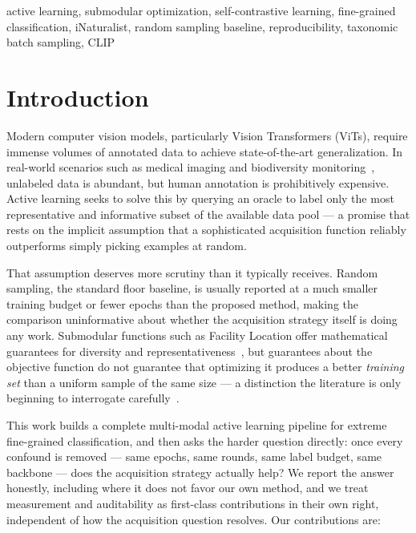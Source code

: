\documentclass[conference]{IEEEtran}
\begin{document}
\begin{IEEEkeywords}
active learning, submodular optimization, self-contrastive learning, fine-grained classification, iNaturalist, random sampling baseline, reproducibility, taxonomic batch sampling, CLIP
\end{IEEEkeywords}

\section{Introduction}

Modern computer vision models, particularly Vision Transformers (ViTs), require immense volumes of annotated data to achieve state-of-the-art generalization. In real-world scenarios such as medical imaging and biodiversity monitoring~\cite{vanhorn2018inaturalist}, unlabeled data is abundant, but human annotation is prohibitively expensive. Active learning seeks to solve this by querying an oracle to label only the most representative and informative subset of the available data pool — a promise that rests on the implicit assumption that a sophisticated acquisition function reliably outperforms simply picking examples at random.

That assumption deserves more scrutiny than it typically receives. Random sampling, the standard floor baseline, is usually reported at a much smaller training budget or fewer epochs than the proposed method, making the comparison uninformative about whether the acquisition strategy itself is doing any work. Submodular functions such as Facility Location offer mathematical guarantees for diversity and representativeness~\cite{nemhauser1978analysis}, but guarantees about the objective function do not guarantee that optimizing it produces a better \emph{training set} than a uniform sample of the same size — a distinction the literature is only beginning to interrogate carefully~\cite{mittal2019parting,munjal2022towards}.

This work builds a complete multi-modal active learning pipeline for extreme fine-grained classification, and then asks the harder question directly: once every confound is removed — same epochs, same rounds, same label budget, same backbone — does the acquisition strategy actually help? We report the answer honestly, including where it does not favor our own method, and we treat measurement and auditability as first-class contributions in their own right, independent of how the acquisition question resolves. Our contributions are:
\end{document}
